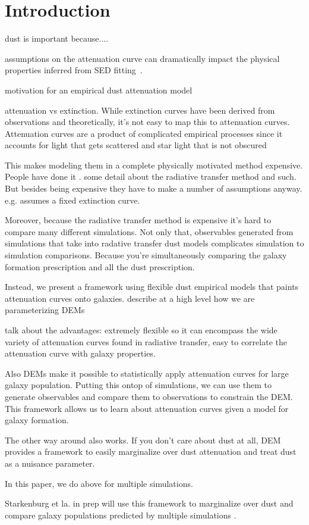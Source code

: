 \section{Introduction} \label{sec:intro} 


dust is important because....


assumptions on the attenuation curve can dramatically impact the physical
properties inferred from SED fitting~\citep[\eg][]{kriek2013, shivaei2015,
reddy2015, salim2020}. 


motivation for an empirical dust attenuation model

attenuation vs extinction. While extinction curves have been derived from
observations and theoretically, it's not easy to map this to attenuation
curves. Attenuation curves are a product of complicated empirical processes
since it accounts for light that gets scattered and star light that is not
obscured 

This makes modeling them in a complete physically motivated method expensive.
People have done it \cite{narayanan2018, trayford2020}. some detail about the
radiative transfer method and such. But besides being expensive they have to
make a number of assumptions anyway. e.g. \cite{narayanan2018} assumes a fixed
extinction curve. 

Moreover, because the radiative transfer method is expensive it's hard to
compare many different simulations. Not only that, observables generated from
simulations that take into radative transfer dust models complicates simulation
to simulation comparisons. Because you're simultaneously comparing the galaxy
formation prescription and all the dust prescription. 

Instead, we present a framework using flexible dust empirical models that
paints attenuation curves onto galaxies. describe at a high level how we are
parameterizing DEMs 

talk about the advantages: extremely flexible so it can encompass the wide variety of
attenuation curves found in radiative transfer, easy to correlate the
attenuation curve with galaxy properties. 

Also DEMs make it possible to statistically apply attenuation curves for large
galaxy population. Putting this ontop of simulations, we can use them to
generate observables and compare them to observations to constrain the DEM. 
This framework allows us to learn about attenuation curves given a model for 
galaxy formation. 

The other way around also works. If you don't care about dust at all, DEM
provides a framework to easily marginalize over dust attenuation and treat dust
as a nuisance parameter. 

In this paper, we do above for multiple simulations. 

Starkenburg et la. in prep will use this framework to marginalize over dust and compare galaxy populations predicted by multiple
simulations . 

